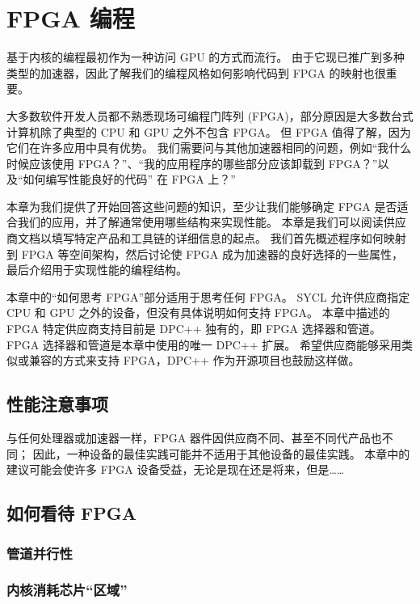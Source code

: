 \section{FPGA 编程}

基于内核的编程最初作为一种访问 GPU 的方式而流行。 由于它现已推广到多种类型的加速器，因此了解我们的编程风格如何影响代码到 FPGA 的映射也很重要。

大多数软件开发人员都不熟悉现场可编程门阵列 (FPGA)，部分原因是大多数台式计算机除了典型的 CPU 和 GPU 之外不包含 FPGA。 但 FPGA 值得了解，因为它们在许多应用中具有优势。 我们需要问与其他加速器相同的问题，例如“我什么时候应该使用 FPGA？”、“我的应用程序的哪些部分应该卸载到 FPGA？”以及“如何编写性能良好的代码” 在 FPGA 上？”

本章为我们提供了开始回答这些问题的知识，至少让我们能够确定 FPGA 是否适合我们的应用，并了解通常使用哪些结构来实现性能。 本章是我们可以阅读供应商文档以填写特定产品和工具链的详细信息的起点。 我们首先概述程序如何映射到 FPGA 等空间架构，然后讨论使 FPGA 成为加速器的良好选择的一些属性，最后介绍用于实现性能的编程结构。

本章中的“如何思考 FPGA”部分适用于思考任何 FPGA。 SYCL 允许供应商指定 CPU 和 GPU 之外的设备，但没有具体说明如何支持 FPGA。 本章中描述的 FPGA 特定供应商支持目前是 DPC++ 独有的，即 FPGA 选择器和管道。 FPGA 选择器和管道是本章中使用的唯一 DPC++ 扩展。 希望供应商能够采用类似或兼容的方式来支持 FPGA，DPC++ 作为开源项目也鼓励这样做。

\subsection{性能注意事项}
与任何处理器或加速器一样，FPGA 器件因供应商不同、甚至不同代产品也不同； 因此，一种设备的最佳实践可能并不适用于其他设备的最佳实践。 本章中的建议可能会使许多 FPGA 设备受益，无论是现在还是将来，但是……

\subsection{如何看待 FPGA}

\subsubsection{管道并行性}

\subsubsection{内核消耗芯片“区域”}

